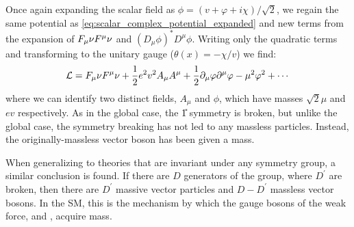 Once again expanding the scalar field as $\phi = (v + \varphi + i \chi) / \sqrt{2}$, we regain the same potential as \cref{eq:scalar_complex_potential_expanded} and new terms from the expansion of $F_\mu\nu F^\mu\nu$ and $(D_\mu \phi)^* D^\mu \phi$. Writing only the quadratic terms and transforming to the unitary gauge ($\theta(x) = -\chi / v$) we find:
\begin{equation}
  \mathcal{L} = F_\mu\nu F^\mu\nu + \frac{1}{2} e^2 v^2 A_\mu A^\mu + \frac{1}{2} \partial_\mu \varphi \partial^\mu \varphi - \mu^2 \varphi^2 + \cdots
\end{equation}
where we can identify two distinct fields, $A_\mu$ and $\phi$, which have masses $\sqrt{2}\mu$ and $ev$ respectively. As in the global case, the \U{1} symmetry is broken, but unlike the global case, the symmetry breaking has not led to any massless particles. Instead, the originally-massless vector boson has been given a mass.

When generalizing to theories that are invariant under any symmetry group, a similar conclusion is found. If there are $D$ generators of the group, where $D^'$ are broken, then there are $D^'$ massive vector particles and $D-D^'$ massless vector bosons. In the SM, this is the mechanism by which the gauge bosons of the weak force, \PWpm and \PZ, acquire mass. 